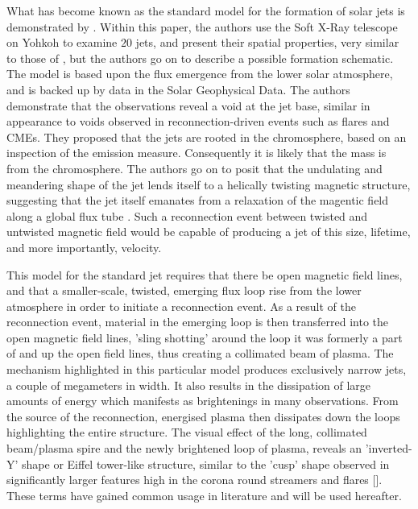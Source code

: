 What has become known as the standard model for the formation of solar jets is demonstrated  by \cite{Shibata1992}.
Within this paper, the authors use the Soft X-Ray telescope on Yohkoh to examine $20$ jets, and present their spatial properties, very similar to those of \cite{Shimojo1996}, but the authors go on to describe a possible formation schematic.
The model is based upon the flux emergence from the lower solar atmosphere, and is backed up by data in the Solar Geophysical Data.
The authors demonstrate that the observations reveal a void at the jet base, similar in appearance to voids observed in reconnection-driven events such as flares and CMEs.
They proposed that the jets are rooted in the chromosphere, based on an inspection of the emission measure.
Consequently it is likely that the mass is from the chromosphere.
The authors go on to posit that the undulating and meandering shape of the jet lends itself to a helically twisting magnetic structure, suggesting that the jet itself emanates from a relaxation of the magentic field along a global flux tube \cite{Shibata1986}.
Such a reconnection event between twisted and untwisted magnetic field would be capable of producing a jet of this size, lifetime, and more importantly, velocity.

This model for the standard jet requires that there be open magnetic field lines, and that a smaller-scale, twisted, emerging flux loop rise from the lower atmosphere in order to initiate a reconnection event.
As a result of the reconnection event, material in the emerging loop is then transferred into the open magnetic field lines, 'sling shotting' around the loop it was formerly a part of and up the open field lines, thus creating a collimated beam of plasma.
The mechanism highlighted in this particular model produces exclusively narrow jets, a couple of megameters in width.
It also results in the dissipation of large amounts of energy which manifests as brightenings in many observations.
From the source of the reconnection, energised plasma then dissipates down the loops highlighting the entire structure.
The visual effect of the long, collimated beam/plasma spire and the newly brightened loop of plasma, reveals an 'inverted-Y' shape or Eiffel tower-like structure, similar to the 'cusp' shape observed in significantly larger features high in the corona round streamers and flares [\cite{Vourlidas2006}].
These terms have gained common usage in literature and will be used hereafter. 

